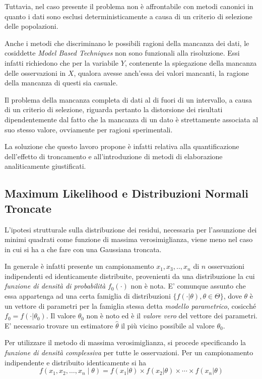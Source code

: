 \documentclass[12pt,openright,twoside,a4paper]{book}
\begin{document}
Tuttavia, nel caso presente il problema non è affrontabile con metodi canonici in quanto i dati sono esclusi deterministicamente a causa di un criterio di selezione delle popolazioni.

Anche i metodi che discriminano le possibili ragioni della mancanza dei dati, le cosiddette \textit{Model Based Techniques} non sono funzionali alla risoluzione.
Essi infatti richiedono che per la variabile $Y$, contenente la spiegazione della mancanza delle osservazioni in $X$, qualora avesse anch'essa dei valori mancanti, la ragione della mancanza di questi sia casuale. \cite{Mdata}

Il problema della mancanza completa di dati al di fuori di un intervallo, a causa di un criterio di selezione, riguarda pertanto la distorsione dei risultati dipendentemente dal fatto che la mancanza di un dato è strettamente associata al suo stesso valore, ovviamente per ragioni sperimentali.

La soluzione che questo lavoro propone è infatti relativa alla quantificazione dell'effetto di troncamento e all'introduzione di metodi di elaborazione analiticamente giustificati.

\subsection{Maximum Likelihood e Distribuzioni Normali Troncate}
L'ipotesi strutturale sulla distribuzione dei residui, necessaria per l'assunzione dei minimi quadrati come funzione di massima verosimiglianza, viene meno nel caso in cui si ha a che fare con una Gaussiana troncata.

In generale è infatti presente un campionamento $x_1,x_3,..,x_n$ di $n$ osservazioni indipendenti ed identicamente distribuite, provenienti da una distribuzione la cui \textit{funzione di densità di probabilità }  $f_0(\cdot)$ non è nota.
E' comunque assunto che essa appartenga ad una certa famiglia di distribuzioni $ \{f(\cdot |\theta),\theta\in\Theta\} $, dove $\theta$ è un vettore di parametri per la famiglia stessa detta \textit{modello parametrico}, cosicché $f_0=f(\cdot |\theta_0)$.
Il valore $\theta_0$ non è noto ed è il \textit{valore vero} del vettore dei parametri.
E' necessario trovare un estimatore $\hat{\theta}$ il più vicino possibile al valore $\theta_0$.

Per utilizzare il metodo di massima verosimiglianza, si procede specificando la \textit{funzione di densità complessiva} per tutte le osservazioni.
Per un campionamento indipendente e distribuito identicamente si ha
\begin{equation}
f(x_1,x_2,\ldots,x_n\mid\theta) = f(x_1|\theta)\times f(x_2|\theta) \times \cdots \times  f(x_n|\theta)
\end{equation}
\end{document}
